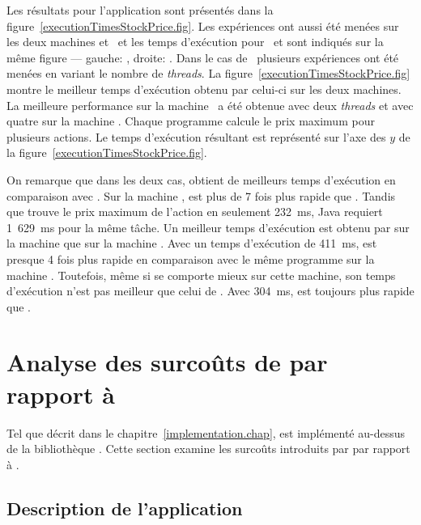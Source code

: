 Les r\'esultats  pour l'application  sont pr\'esent\'es dans la figure~\ref{executionTimesStockPrice.fig}. Les expériences ont aussi \'et\'e menées sur les deux machines  et~ et les temps d'ex\'ecution pour \ppff\ et  sont indiqu\'es sur la m\^eme figure --- gauche: , droite: . 
%
Dans le cas de \ppff\, plusieurs exp\'eriences ont \'et\'e men\'ees en variant le nombre de \emph{threads}. La figure~\ref{executionTimesStockPrice.fig} montre le meilleur temps d'ex\'ecution obtenu par celui-ci sur les deux machines. La meilleure performance sur la machine \ a \'et\'e obtenue avec deux \emph{threads} et avec quatre sur la machine .
%
Chaque programme calcule le prix maximum pour plusieurs actions. Le temps d'ex\'ecution r\'esultant est repr\'esent\'e sur l'axe des $y$ de la figure~\ref{executionTimesStockPrice.fig}. 

On remarque que dans les deux cas,  obtient de meilleurs temps d'ex\'ecution en comparaison avec . Sur la machine ,  est plus de 7 fois plus rapide que . Tandis que  trouve le prix maximum de l'action en seulement 232~ms, Java requiert 1~629~ms pour la m\^eme t\^ache. Un meilleur temps d'ex\'ecution est obtenu par  sur la machine  que sur la machine . Avec un temps d'ex\'ecution de 411~ms,  est presque 4 fois plus rapide en comparaison avec le m\^eme programme  sur la machine . Toutefois, m\^eme si  se comporte mieux sur cette machine, son temps d'ex\'ecution n'est pas meilleur que celui de . Avec 304~ms,  est toujours plus rapide que . 


\section{Analyse des surco\^uts de  par rapport \`a }
\label{coutsPpFf.sect}

Tel que d\'ecrit dans le chapitre~\ref{implementation.chap},  est impl\'ement\'e au-dessus de la biblioth\`eque . Cette section examine les surco\^uts introduits par  par rapport \`a . 

\subsection{Description de l'application}

